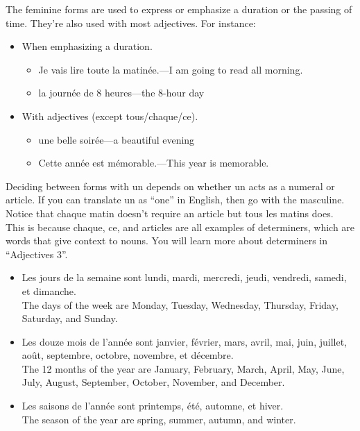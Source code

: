 The feminine forms are used to express or emphasize a duration or the passing of time. They're also used with most adjectives. For instance:

\begin{itemize}
  \item  When emphasizing a duration.
    \begin{itemize}
      \item  Je vais lire toute la matin{\'e}e.---I am going to read all morning.
      \item  la journ{\'e}e de 8 heures---the 8-hour day
    \end{itemize}
  \item  With adjectives (except tous/chaque/ce).
    \begin{itemize}
      \item  une belle soir{\'e}e---a beautiful evening
      \item  Cette ann{\'e}e est m{\'e}morable.---This year is memorable.
    \end{itemize}
\end{itemize}

Deciding between forms with un depends on whether un acts as a numeral or article. If you can translate un as ``one'' in English, then go with the masculine.  Notice that chaque matin doesn't require an article but tous les matins does. This is because chaque, ce, and articles are all examples of determiners, which are words that give context to nouns. You will learn more about determiners in ``Adjectives 3''.

\begin{itemize}
  \item  Les jours de la semaine sont lundi, mardi, mercredi, jeudi, vendredi, samedi, et dimanche. \\ The days of the week are Monday, Tuesday, Wednesday, Thursday, Friday, Saturday, and Sunday.
  \item  Les douze mois de l'ann{\'e}e sont janvier, f{\'e}vrier, mars, avril, mai, juin, juillet, ao{\^u}t, septembre, octobre, novembre, et d{\'e}cembre. \\ The 12 months of the year are January, February, March, April, May, June, July, August, September, October, November, and December.
  \item  Les saisons de l'ann{\'e}e sont printemps, {\'e}t{\'e}, automne, et hiver. \\ The season of the year are spring, summer, autumn, and winter.
\end{itemize}


